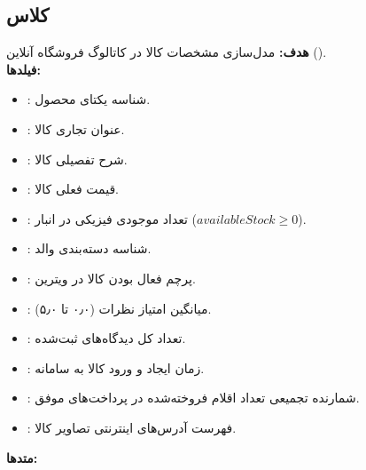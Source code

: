 \documentclass[11pt,a4paper]{article}
\begin{document}
\subsection{کلاس  }
\textbf{هدف:} مدل‌سازی مشخصات کالا در کاتالوگ فروشگاه آنلاین ().\\
\textbf{فیلدها:}
\begin{itemize}
    \item {}: شناسه یکتای محصول.
    \item {}: عنوان تجاری کالا.
    \item {}: شرح تفصیلی کالا.
    \item {}: قیمت فعلی کالا.
    \item {}: تعداد موجودی فیزیکی در انبار ($availableStock \ge 0$).
    \item {}: شناسه دسته‌بندی والد.
    \item {}: پرچم فعال بودن کالا در ویترین.
    \item {}: میانگین امتیاز نظرات (۰٫۰ تا ۵٫۰).
    \item {}: تعداد کل دیدگاه‌های ثبت‌شده.
    \item {}: زمان ایجاد و ورود کالا به سامانه.
    \item {}: شمارنده تجمیعی تعداد اقلام فروخته‌شده در پرداخت‌های موفق.
    \item {}: فهرست آدرس‌های اینترنتی تصاویر کالا.
\end{itemize}
\textbf{متدها:}
\end{document}
